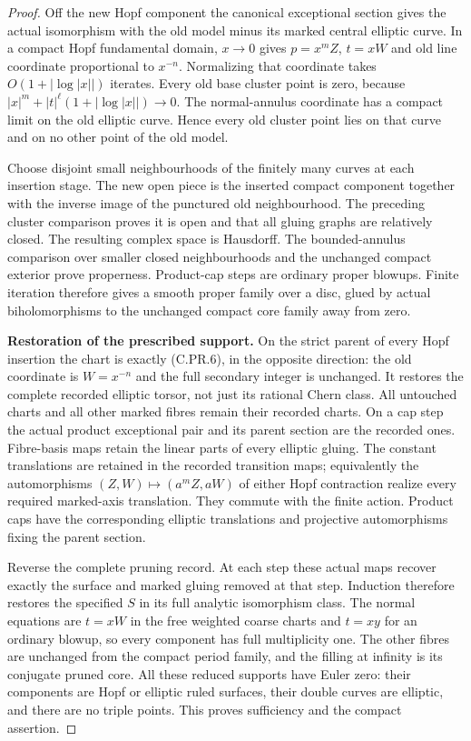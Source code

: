 \begin{proof}
Off the new Hopf component the canonical exceptional section
gives the actual isomorphism with the old model minus its
marked central elliptic curve. In a compact Hopf fundamental
domain, $x\to0$ gives $p=x^mZ$, $t=xW$ and old line coordinate
proportional to $x^{-n}$. Normalizing that coordinate takes
$O(1+|\log|x||)$ iterates. Every old base cluster point is zero,
because
$|x|^m+|t|^\ell(1+|\log|x||)\to0$.
The normal-annulus coordinate has a compact limit on the old
elliptic curve. Hence every old cluster point lies on that
curve and on no other point of the old model.

Choose disjoint small neighbourhoods of the finitely many
curves at each insertion stage. The new open piece is the
inserted compact component together with the inverse image
of the punctured old neighbourhood. The preceding cluster
comparison proves it is open and that all gluing graphs are
relatively closed. The resulting complex space is Hausdorff.
The bounded-annulus comparison over smaller closed
neighbourhoods and the unchanged compact exterior prove
properness. Product-cap steps are ordinary proper blowups.
Finite iteration therefore gives a smooth proper family over
a disc, glued by actual biholomorphisms to the unchanged
compact core family away from zero.

\par\medskip\noindent\textbf{Restoration of the prescribed support.}
On the strict parent of every Hopf insertion the chart is
exactly (C.PR.6), in the opposite direction: the old coordinate
is $W=x^{-n}$ and the full secondary integer is unchanged.
It restores the complete recorded elliptic torsor, not just
its rational Chern class. All untouched charts and all
other marked fibres remain their recorded charts. On a cap
step the actual product exceptional pair and its parent
section are the recorded ones. Fibre-basis maps retain
the linear parts of every elliptic gluing. The constant
translations are retained in the recorded transition maps;
equivalently the automorphisms
$(Z,W)\mapsto(a^mZ,aW)$ of either Hopf contraction realize
every required marked-axis translation. They commute with
the finite action. Product caps have the corresponding
elliptic translations and projective automorphisms fixing
the parent section.

Reverse the complete pruning record. At each step these
actual maps recover exactly the surface and marked gluing
removed at that step. Induction therefore restores the
specified $S$ in its full analytic isomorphism class.
The normal equations are $t=xW$ in the free weighted
coarse charts and $t=xy$ for an ordinary blowup, so every
component has full multiplicity one. The other fibres
are unchanged from the compact period family, and the
filling at infinity is its conjugate pruned core.
All these reduced supports have Euler zero: their
components are Hopf or elliptic ruled surfaces, their
double curves are elliptic, and there are no triple points.
This proves sufficiency and the compact assertion.


\end{proof}
